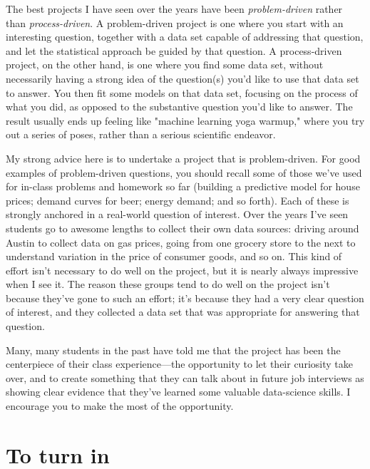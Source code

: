 \documentclass{mynotes}
\begin{document}
The best projects I have seen over the years have been \textit{problem-driven} rather than \textit{process-driven}.  A problem-driven project is one where you start with an interesting question, together with a data set capable of addressing that question, and let the statistical approach be guided by that question.  A process-driven project, on the other hand, is one where you find some data set, without necessarily having a strong idea of the question(s) you'd like to use that data set to answer.  You then fit some models on that data set, focusing on the process of what you did, as opposed to the substantive question you'd like to answer.  The result usually ends up feeling like "machine learning yoga warmup," where you try out a series of poses, rather than a serious scientific endeavor.  

My strong advice here is to undertake a project that is problem-driven.  For good examples of problem-driven questions, you should recall some of those we've used for in-class problems and homework so far (building a predictive model for house prices; demand curves for beer; energy demand; and so forth).  Each of these is strongly anchored in a real-world question of interest.  Over the years I've seen students go to awesome lengths to collect their own data sources: driving around Austin to collect data on gas prices, going from one grocery store to the next to understand variation in the price of consumer goods, and so on.  This kind of effort isn't necessary to do well on the project, but it is nearly always impressive when I see it.  The reason these groups tend to do well on the project isn't because they've gone to such an effort; it's because they had a very clear question of interest, and they collected a data set that was appropriate for answering that question.

Many, many students in the past have told me that the project has been the centerpiece of their class experience---the opportunity to let their curiosity take over, and to create something that they can talk about in future job interviews as showing clear evidence that they've learned some valuable data-science skills.  I encourage you to make the most of the opportunity.

\section{To turn in}
\end{document}
